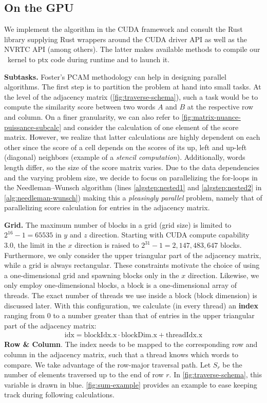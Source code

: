 \subsection{On the GPU}

We implement the algorithm in the CUDA framework and consult the  Rust library supplying Rust wrappers around the CUDA driver API as well as the NVRTC API (among others). The latter makes available methods to compile our \Cpp~kernel to \gls{ptx} code during runtime and to launch it.

\textbf{Subtasks.} Foster's PCAM methodology \cite{foster} can help in designing parallel algorithms. The first step is to partition the problem at hand into small tasks. At the level of the adjacency matrix (\autoref{fig:traverse-schema}), such a task would be to compute the similarity score between two words $A$ and $B$ at the respective row and column. On a finer granularity, we can also refer to \autoref{fig:matrix-nuance-puissance-subcalc} and consider the calculation of one element of the score matrix. However, we realize that latter calculations are highly dependent on each other since the score of a cell depends on the scores of its up, left and up-left (diagonal) neighbors (example of a \textit{stencil computation}). Additionally, words length differ, so the size of the score matrix varies. Due to the data dependencies and the varying problem size, we decide to focus on parallelizing the for-loops in the Needleman–Wunsch algorithm (lines \ref{algstep:nested1} and \ref{algstep:nested2} in \autoref{alg:needleman-wunsch}) making this a \textit{pleasingly parallel} problem, namely that of parallelizing score calculation for entries in the adjacency matrix.

\textbf{Grid.} The maximum number of blocks in a grid (grid size) is limited to $2^{16} - 1 = 65535$ in $y$ and $z$ direction. Starting with CUDA compute capability 3.0, the limit in the $x$ direction is raised to $2^{31} - 1 = 2,147,483,647$ blocks. Furthermore, we only consider the upper triangular part of the adjacency matrix, while a grid is always rectangular. These constraints motivate the choice of using a one-dimensional grid and spawning blocks only in the $x$ direction. Likewise, we only employ one-dimensional blocks, \ie a block is a one-dimensional array of threads. The exact number of threads we use inside a block (block dimension) is discussed later. With this configuration, we calculate (in every thread) an \textbf{index} ranging from $0$ to a number greater than that of entries in the upper triangular part of the adjacency matrix:
\begin{align}
    \text{idx} = \text{blockIdx.x} \cdot \text{blockDim.x} + \text{threadIdx.x}
    \label{eq:idx}
\end{align}
\textbf{Row \& Column}. The index  needs to be mapped to the corresponding row and column in the adjacency matrix, such that a thread knows which words to compare. We take advantage of the row-major traversal path. Let $S_r$ be the number of elements traversed up to the end of row $r$. In \autoref{fig:traverse-schema}, this variable is drawn in blue. \autoref{fig:sum-example} provides an example to ease keeping track during following calculations.

